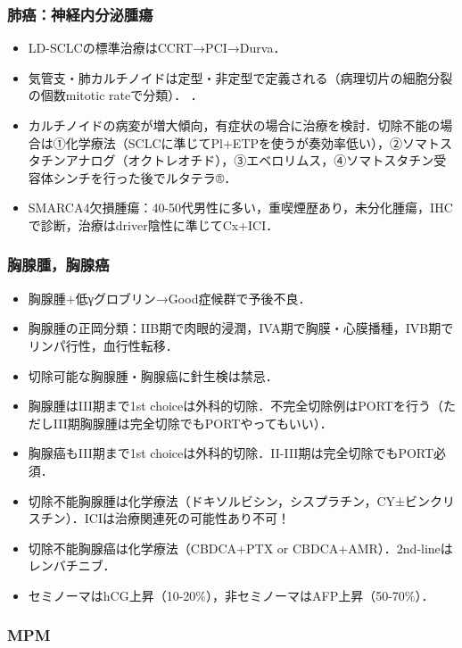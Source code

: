 \subsubsection{肺癌：神経内分泌腫瘍}

\begin{itemize}
\item LD-SCLCの標準治療はCCRT→PCI→Durva．
\item 気管支・肺カルチノイドは定型・非定型で定義される（病理切片の細胞分裂の個数mitotic rateで分類）．
．
\item カルチノイドの病変が増大傾向，有症状の場合に治療を検討．切除不能の場合は①化学療法（SCLCに準じてPl+ETPを使うが奏効率低い），②ソマトスタチンアナログ（オクトレオチド），③エベロリムス，④ソマトスタチン受容体シンチを行った後でルタテラ®．
\item SMARCA4欠損腫瘍：40-50代男性に多い，重喫煙歴あり，未分化腫瘍，IHCで診断，治療はdriver陰性に準じてCx+ICI．
\end{itemize}


\subsubsection{胸腺腫，胸腺癌}

\begin{itemize}
\item 胸腺腫+低γグロブリン→Good症候群で予後不良．
\item 胸腺腫の正岡分類：IIB期で肉眼的浸潤，IVA期で胸膜・心膜播種，IVB期でリンパ行性，血行性転移．
\item 切除可能な胸腺腫・胸腺癌に針生検は禁忌．
\item 胸腺腫はIII期まで1st choiceは外科的切除．不完全切除例はPORTを行う（ただしIII期胸腺腫は完全切除でもPORTやってもいい）．
\item 胸腺癌もIII期まで1st choiceは外科的切除．II-III期は完全切除でもPORT必須．
\item 切除不能胸腺腫は化学療法（ドキソルビシン，シスプラチン，CY±ビンクリスチン）．ICIは治療関連死の可能性あり不可！
\item 切除不能胸腺癌は化学療法（CBDCA+PTX or CBDCA+AMR）．2nd-lineはレンバチニブ．
\item セミノーマはhCG上昇（10-20\%），非セミノーマはAFP上昇（50-70\%）．
\end{itemize}


\subsubsection{MPM}

